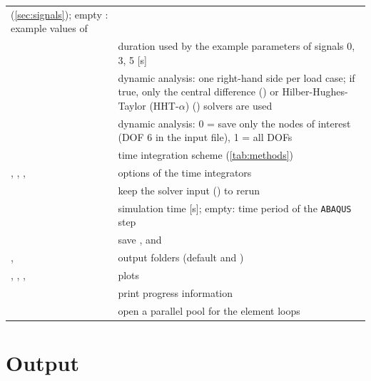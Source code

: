\begin{xltabular}{\linewidth}{@{}P{5.2cm}L@{}}
    (\cref{sec:signals}); empty : example values of
     \\
   & duration used by the example parameters of signals 0, 3, 5 [s] \\
   & dynamic analysis: one right-hand side per load case; if
    true, only the central difference () or Hilber-Hughes-Taylor (HHT-$\alpha$)
    () solvers are used \\
   & dynamic analysis: 0 = save only the nodes of interest (DOF 6
    in the input file), 1 = all DOFs \\
   & time integration scheme (\cref{tab:methods}) \\
  , , ,  &
    options of the time integrators \\
   & keep the solver input
    () to rerun  \\
   & simulation time [s]; empty: time period of the \texttt{ABAQUS} step \\
   & save ,  and  \\
  ,  & output folders (default
     and ) \\
  , , ,  & plots \\
   & print progress information \\
   & open a parallel pool for the element loops \\
  \bottomrule
\end{xltabular}

\section{Output}

